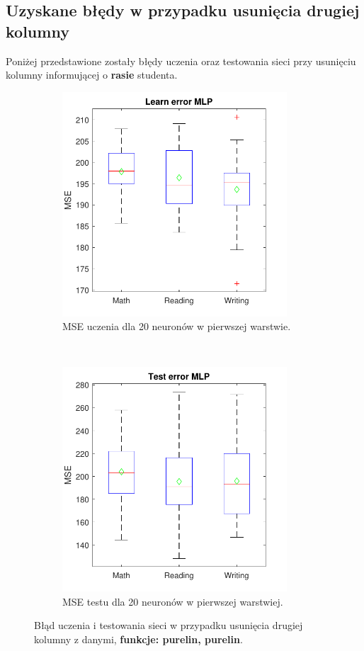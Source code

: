 \documentclass[12pt]{article}
\begin{document}
\subsection{Uzyskane błędy w przypadku usunięcia drugiej  kolumny}
Poniżej przedstawione zostały błędy uczenia oraz testowania sieci przy usunięciu kolumny informującej o \textbf{rasie} studenta.

\begin{figure}[H]
\centering
\begin{subfigure}[t]{0.48\textwidth} 
\centering
\includegraphics[height=3.3in]{purelin_purelin_20_without_2_learnBoxplot.pdf}
\caption{MSE uczenia dla  20 neuronów w pierwszej warstwie.}
\end{subfigure}
~~
\begin{subfigure}[t]{0.48\textwidth} 
\centering
\includegraphics[height=3.3in]{purelin_purelin_20_without_2_testBoxplot.pdf}
\caption{MSE testu dla  20  neuronów w pierwszej warstwiej.}
\end{subfigure}

\caption{Błąd uczenia i testowania sieci w przypadku usunięcia drugiej kolumny z danymi, \textbf{funkcje: purelin, purelin}.}
\end{figure}
\end{document}
